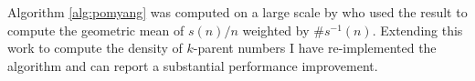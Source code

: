 \documentclass{article}
\theoremstyle{definition}
\begin{document}
Algorithm \ref{alg:pomyang} was computed on a large scale by \cite{chum_guy_jacobson_mosunov_2018} who used the result to compute the geometric mean of $s(n) / n$ weighted by $\#s^{-1}(n)$. Extending this work to compute the density of $k$-parent numbers I have re-implemented the algorithm and can report a substantial performance improvement.



\end{document}
